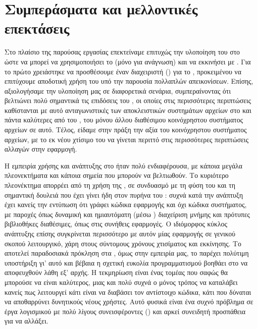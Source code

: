 \chapter{Συμπεράσματα και μελλοντικές επεκτάσεις}
Στο πλαίσιο της παρούσας εργασίας επεκτείναμε επιτυχώς την υλοποίηση του
\viofs{} στο \osv{} ώστε να μπορεί να χρησιμοποιήσει το  (μόνο
για ανάγνωση) και να εκκινήσει με \viofs{} . Για το πρώτο
χρειάστηκε να προσθέσουμε έναν διαχειριστή () για το , προκειμένου να επιτύχουμε αποδοτική χρήση του υπό την παρουσία
πολλαπλών απεικονίσεων. Επίσης, αξιολογήσαμε την υλοποίηση μας σε διαφορετικά
σενάρια, συμπεραίνοντας ότι βελτιώνει πολύ σημαντικά τις επιδόσεις του \viofs{},
οι οποίες στις περισσότερες περιπτώσεις καθίστανται με αυτό ανταγωνιστικές των
αποκλειστικών συστημάτων αρχείων στο \osv{} και πάντα καλύτερες από του
, του μόνου άλλου διαθέσιμου κοινόχρηστου συστήματος αρχείων σε αυτό.
Τέλος, είδαμε στην πράξη την αξία του κοινόχρηστου συστήματος αρχείων, με το εκ
νέου χτίσιμο του  να γίνεται περιττό στις περισσότερες περιπτώσεις
αλλαγών στην εφαρμογή.

Η εμπειρία χρήσης και ανάπτυξης στο \osv{} ήταν πολύ ενδιαφέρουσα, με κάποια
μεγάλα πλεονεκτήματα και κάποια σημεία που μπορούν να βελτιωθούν. Το κυριότερο
πλεονέκτημα απορρέει από τη χρήση της , σε συνδυασμό με τη φύση του
 και τη σημαντική δουλειά που έχει γίνει ήδη στον πυρήνα του
\osv{}: συχνά κατά την ανάπτυξη έχει κανείς την εντύπωση ότι γράφει κώδικα
εφαρμογής και όχι κώδικα συστήματος, με παροχές όπως δυναμική και ημιαυτόματη
(μέσω ) διαχείριση μνήμης και πρότυπες βιβλιοθήκες
διαθέσιμες, όπως στις συνήθεις εφαρμογές. Ο ιδιόμορφος κύκλος ανάπτυξης επίσης
συγκρίνεται περισσότερο με αυτόν μίας εφαρμογής σε γενικού σκοπού λειτουργικό,
χάρη στους σύντομους χρόνους χτισίματος και εκκίνησης. Το 
αποτελεί παραδοσιακά πρόκληση στα , όμως στην εμπειρία μας, το
\osv{} παρέχει πολύτιμη υποστήριξη γι' αυτό \cite{osv-wiki:debugging} και βέβαια
η σχετική ευκολία προγραμματισμού βοηθάει στο να αποφευχθούν λάθη εξ' αρχής. Η
τεκμηρίωση είναι ένας τομέας που σαφώς θα μπορούσε να είναι καλύτερος, μιας και
πολύ συχνά ο μόνος τρόπος να καταλάβει κανείς πως λειτουργεί κάτι είναι να
διαβάσει τον αντίστοιχο κώδικα, κάτι που δύναται να αποθαρρύνει δυνητικούς νέους
χρήστες. Αυτό φυσικά είναι ένα συχνό πρόβλημα σε έργα λογισμικού με πολύ λίγους
συνεισφέροντες () και αρκεί συνειδητή προσπάθεια για να
αλλάξει.

